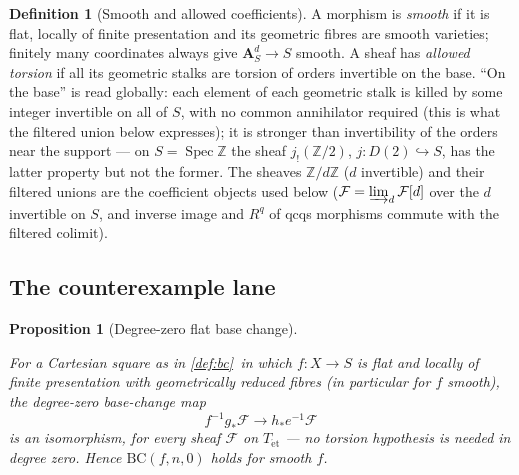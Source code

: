 \documentclass[11pt]{article}
\makeatletter
\theoremstyle{plain}
\newtheorem{proposition}[theorem]{Proposition}
\theoremstyle{definition}
\newtheorem{definition}[theorem]{Definition}
\newcommand{\Z}{\mathbb Z}
\newcommand{\Aaf}{\mathbf A}
\newcommand{\Et}{\mathrm{\acute{e}t}}
\DeclareMathOperator{\Spec}{Spec}
\newcommand{\up}[1]{%
  \ifcsname r@#1\endcsname
    \hyperref[#1]{\texttt{\scriptsize #1}}%
  \else
    \texttt{\scriptsize #1}%
  \fi}
\newcommand{\uses}[1]{\par\smallskip\noindent{\footnotesize\textit{Uses:}\ #1\par}\smallskip}
\newcommand{\Cref}[1]{\hyperref[#1]{\ref{#1}}\,\hyperref[#1]{\nameref*{#1}}}
\makeatother
\begin{document}
\begin{definition}[Smooth and allowed coefficients]
\label{def:smooth}
A morphism is \emph{smooth} if it is flat, locally of finite
presentation and its geometric fibres are smooth varieties; finitely
many coordinates always give
$\Aaf^d_S\to S$ smooth.  A sheaf has \emph{allowed torsion} if all
its geometric stalks are torsion of orders invertible on the base.
``On the base'' is read globally:  each element of each geometric
stalk is killed by some integer invertible on all of $S$, with no
common annihilator required (this is what the filtered union below
expresses); it is stronger than invertibility of the orders near the
support --- on $S=\Spec\Z$ the sheaf $j_!(\Z/2)$,
$j:D(2)\hookrightarrow S$, has the latter property but not the
former.  The sheaves $\Z/d\Z$ ($d$ invertible) and their filtered
unions are the coefficient objects used below
($\mathcal F=\varinjlim_d\mathcal F[d]$ over the $d$ invertible on
$S$, and inverse image and $R^q$ of qcqs morphisms commute with the
filtered colimit).
\end{definition}

\subsection{The counterexample lane}

\begin{proposition}[Degree-zero flat base change]
\label{prop:deg0}
\uses{\up{def:bc}}
For a Cartesian square as in \Cref{def:bc} in which $f:X\to S$ is flat
and locally of finite presentation with geometrically reduced fibres (in
particular for $f$ smooth), the degree-zero base-change map
\[
 f^{-1}g_*\mathcal F\longrightarrow h_*e^{-1}\mathcal F
\]
is an isomorphism, for \emph{every} sheaf $\mathcal F$ on $T_{\Et}$ --- no
torsion hypothesis is needed in degree zero.  Hence
$\mathrm{BC}(f,n,0)$ holds for smooth $f$.
\end{proposition}
\end{document}
